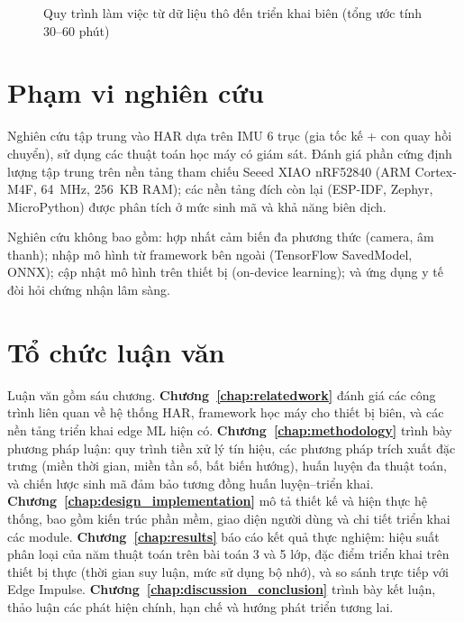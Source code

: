 \begin{figure}[H]
{%
}
\caption{Quy trình làm việc từ dữ liệu thô đến triển khai biên (tổng ước tính 30--60 phút)}
\label{fig:workflow}
\end{figure}

\section{Phạm vi nghiên cứu}

Nghiên cứu tập trung vào HAR dựa trên IMU 6 trục (gia tốc kế + con quay hồi chuyển), sử dụng các thuật toán học máy có giám sát. Đánh giá phần cứng định lượng tập trung trên nền tảng tham chiếu Seeed XIAO nRF52840 (ARM Cortex-M4F, 64~MHz, 256~KB RAM); các nền tảng đích còn lại (ESP-IDF, Zephyr, MicroPython) được phân tích ở mức sinh mã và khả năng biên dịch.

Nghiên cứu không bao gồm: hợp nhất cảm biến đa phương thức (camera, âm thanh); nhập mô hình từ framework bên ngoài (TensorFlow SavedModel, ONNX); cập nhật mô hình trên thiết bị (on-device learning); và ứng dụng y tế đòi hỏi chứng nhận lâm sàng.

\section{Tổ chức luận văn}

Luận văn gồm sáu chương. \textbf{Chương~\ref{chap:relatedwork}} đánh giá các công trình liên quan về hệ thống HAR, framework học máy cho thiết bị biên, và các nền tảng triển khai edge ML hiện có. \textbf{Chương~\ref{chap:methodology}} trình bày phương pháp luận: quy trình tiền xử lý tín hiệu, các phương pháp trích xuất đặc trưng (miền thời gian, miền tần số, bất biến hướng), huấn luyện đa thuật toán, và chiến lược sinh mã đảm bảo tương đồng huấn luyện--triển khai. \textbf{Chương~\ref{chap:design_implementation}} mô tả thiết kế và hiện thực hệ thống, bao gồm kiến trúc phần mềm, giao diện người dùng và chi tiết triển khai các module. \textbf{Chương~\ref{chap:results}} báo cáo kết quả thực nghiệm: hiệu suất phân loại của năm thuật toán trên bài toán 3 và 5 lớp, đặc điểm triển khai trên thiết bị thực (thời gian suy luận, mức sử dụng bộ nhớ), và so sánh trực tiếp với Edge Impulse. \textbf{Chương~\ref{chap:discussion_conclusion}} trình bày kết luận, thảo luận các phát hiện chính, hạn chế và hướng phát triển tương lai.
